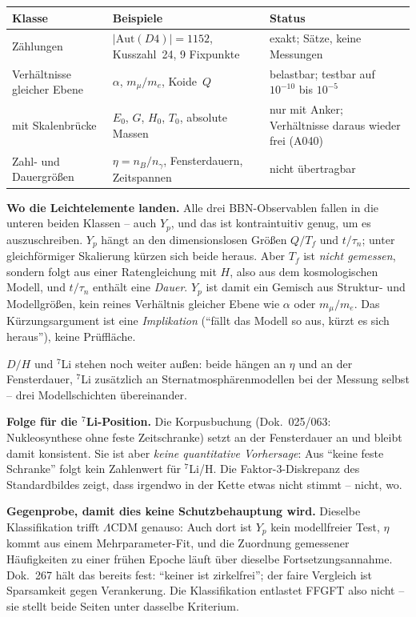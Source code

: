 \documentclass[11pt]{report}
\begin{document}
\begin{center}
\begin{tabular}{llp{4.6cm}}
\toprule
Klasse & Beispiele & Status \\
\midrule
Zählungen & $|\text{Aut}(D4)| = 1152$, Kusszahl~24,
  9 Fixpunkte & exakt; Sätze, keine Messungen \\
Verhältnisse gleicher Ebene & $\alpha$, $m_\mu/m_e$,
  Koide~$Q$ & belastbar; testbar auf
  $10^{-10}$ bis $10^{-5}$ \\
mit Skalenbrücke & $E_0$, $G$, $H_0$, $T_0$,
  absolute Massen & nur mit Anker; Verhältnisse daraus wieder
  frei (A040) \\
Zahl- und Dauergrößen & $\eta = n_B/n_\gamma$, Fensterdauern,
  Zeitspannen & nicht übertragbar \\
\bottomrule
\end{tabular}
\end{center}

\textbf{Wo die Leichtelemente landen.} Alle drei
BBN-Observablen fallen in die unteren beiden Klassen -- auch
$Y_p$, und das ist kontraintuitiv genug, um es auszuschreiben.
$Y_p$ hängt an den dimensionslosen Größen $Q/T_f$ und
$t/\tau_n$; unter gleichförmiger Skalierung kürzen sich beide
heraus. Aber $T_f$ ist \emph{nicht gemessen}, sondern folgt aus
einer Ratengleichung mit $H$, also aus dem kosmologischen Modell,
und $t/\tau_n$ enthält eine \emph{Dauer}. $Y_p$ ist damit ein
Gemisch aus Struktur- und Modellgrößen, kein reines Verhältnis
gleicher Ebene wie $\alpha$ oder $m_\mu/m_e$. Das Kürzungsargument
ist eine \emph{Implikation} (\enquote{fällt das Modell so aus,
kürzt es sich heraus}), keine Prüffläche.

$D/H$ und ${}^7$Li stehen noch weiter außen: beide hängen an
$\eta$ und an der Fensterdauer, ${}^7$Li zusätzlich an
Sternatmosphärenmodellen bei der Messung selbst -- drei
Modellschichten übereinander.

\textbf{Folge für die ${}^7$Li-Position.} Die Korpusbuchung
(Dok.~025/063: Nukleosynthese ohne feste Zeitschranke) setzt an
der Fensterdauer an und bleibt damit konsistent. Sie ist aber
\emph{keine quantitative Vorhersage}: Aus \enquote{keine feste
Schranke} folgt kein Zahlenwert für ${}^7$Li/H. Die
Faktor-3-Diskrepanz des Standardbildes zeigt, dass irgendwo in
der Kette etwas nicht stimmt -- nicht, wo.

\textbf{Gegenprobe, damit dies keine Schutzbehauptung wird.}
Dieselbe Klassifikation trifft $\Lambda$CDM genauso: Auch dort
ist $Y_p$ kein modellfreier Test, $\eta$ kommt aus einem
Mehrparameter-Fit, und die Zuordnung gemessener Häufigkeiten zu
einer frühen Epoche läuft über dieselbe Fortsetzungsannahme.
Dok.~267 hält das bereits fest: \enquote{keiner ist zirkelfrei};
der faire Vergleich ist Sparsamkeit gegen Verankerung. Die
Klassifikation entlastet FFGFT also nicht -- sie stellt beide
Seiten unter dasselbe Kriterium.
\end{document}
